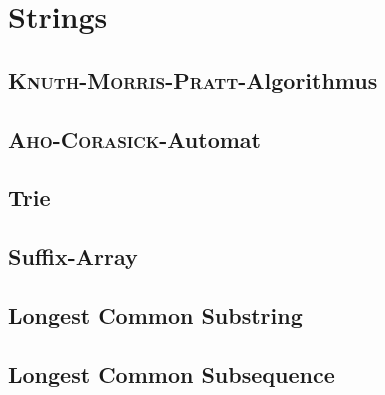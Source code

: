 \section{Strings}

\subsection{\textsc{Knuth-Morris-Pratt}-Algorithmus}


\subsection{\textsc{Aho-Corasick}-Automat}


\subsection{Trie}


\subsection{Suffix-Array}


\subsection{Longest Common Substring}


\subsection{Longest Common Subsequence}

